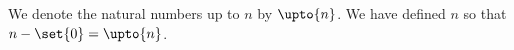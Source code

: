 We denote the natural numbers up to $n$ by $\upto{n}$.
We have defined $n$ so that $n - \set{0} = \upto{n}$.


%
%
%

%
%
%
%
%
%
%
%
%
